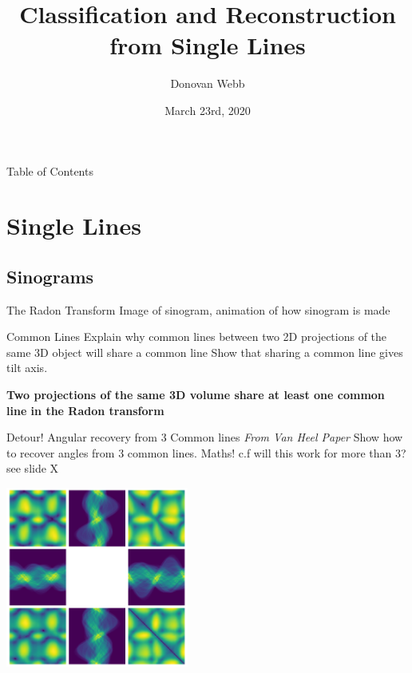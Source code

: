 \documentclass[t, 11pt]{beamer}
\date{March 23rd, 2020}
\author{Donovan Webb}
\institute{eBIC/University of Bath}
\title{Classification and Reconstruction from Single Lines}
\begin{document}
\begin{frame}[plain]
  \maketitle
\end{frame}
\addtocounter{framenumber}{-1} %

\begin{frame}{Table of Contents}
  \tableofcontents[sectionstyle=show/show, hideallsubsections]
\end{frame}


\section{Single Lines}
\subsection{Sinograms}

\begin{frame}[fragile]{The Radon Transform}
  Image of sinogram, animation of how sinogram is made
\end{frame}

\begin{frame}[fragile]{Common Lines}
  Explain why common lines between two 2D projections of the same 3D object will share a common line
  Show that sharing a common line gives tilt axis.

  \textbf{Two projections of the same 3D volume share at least one common line in the Radon transform}
\end{frame}

\begin{frame}[fragile]{Detour! Angular recovery from 3 Common lines}
  \textit{\tiny{From Van Heel Paper}}
  Show how to recover angles from 3 common lines. Maths!
  c.f will this work for more than 3? see slide X
  \begin{center}\includegraphics[width=0.45\textwidth]{images/Sinogram_3_comp.png}
    \end{center}
\end{frame}
\end{document}
